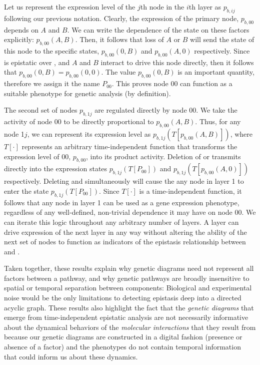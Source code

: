 Let us represent the expression level of the \(j\)th node in the \(i\)th layer
as \(p_{b, ij}\) following our previous notation. Clearly, the expression of the
primary node, \(p_{b, 00}\) depends on \(A\) and \(B\). We can write the
dependence of the state on these factors explicitly: \(p_{b, 00}(A, B)\). Then,
it follows that loss of \(A\) or \(B\) will send the state of this node to the
specific states, \(p_{b, 00}(0, B)\) and \(p_{b, 00}(A, 0)\) respectively. Since
 is epistatic over , and \(A\) and \(B\) interact to drive this
node directly, then it follows that \(p_{b, 00}(0, B) = p_{b, 00}(0, 0)\). The
value \(p_{b, 00}(0, B)\) is an important quantity, therefore we assign it the
name \(P_{00}\). This proves node 00 can function as a suitable phenotype for
genetic analysis (by definition).

The second set of nodes \(p_{b, 1j}\) are regulated directly by node 00. We take
the activity of node 00 to be directly proportional to \(p_{b, 00}(A, B)\). Thus,
for any node 1\(j\), we can represent its expression level as
\(p_{b, 1j}(T[p_{b, 00}(A, B)])\), where \(T[\cdot]\) represents an arbitrary
time-independent function that transforms the expression level of 00,
\(p_{b, 00}\), into its product activity. Deletion of  or 
transmits directly into the expression states \(p_{b, 1j}(T[P_{00}])\) and
\(p_{b, 1j}(T[p_{b, 00}(A, 0)])\) respectively. Deleting  and 
simultaneously will cause the any node in layer 1 to enter the state
\(p_{b, 1j}(T[P_{00}])\). Since \(T[\cdot]\) is a time-independent function, it
follows that any node in layer 1 can be used as a gene expression phenotype,
regardless of any well-defined, non-trivial dependence it may have on node 00.
We can iterate this logic throughout any arbitrary number of layers. A layer can
drive expression of the next layer in any way without altering the ability of
the next set of nodes to function as indicators of the epistasis relationship
between  and .

Taken together, these results explain why genetic diagrams need not represent
all factors between a pathway, and why genetic pathways are broadly insensitive
to spatial or temporal separation between components: Biological and
experimental noise would be the only limitations to detecting epistasis deep
into a directed acyclic graph. These results also highlight the fact that the
\emph{genetic diagrams} that emerge from time-independent epistatic analysis are
not necessarily informative about the dynamical behaviors of the \emph{molecular
interactions} that they result from because our genetic diagrams are constructed
in a digital fashion (presence or absence of a factor) and the phenotypes do not
contain temporal information that could inform us about these dynamics.

